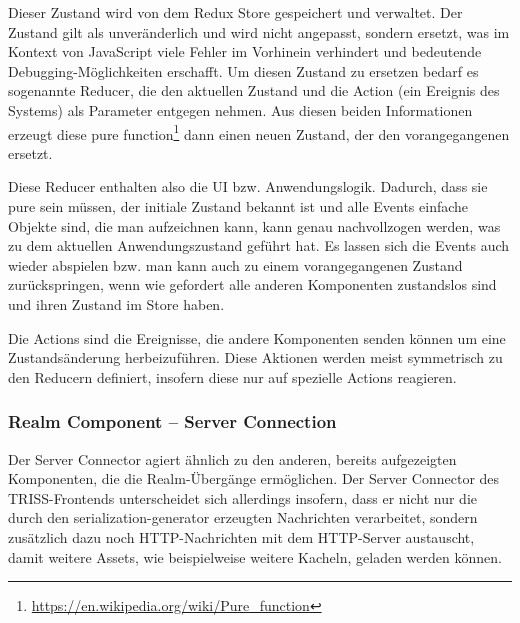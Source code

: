 Dieser Zustand wird von dem Redux Store gespeichert und verwaltet.
Der Zustand gilt als unveränderlich und wird nicht angepasst, sondern ersetzt, was im Kontext von JavaScript viele Fehler im Vorhinein verhindert und bedeutende Debugging-Möglichkeiten erschafft.
Um diesen Zustand zu ersetzen bedarf es sogenannte Reducer, die den aktuellen Zustand und die Action (ein Ereignis des Systems) als Parameter entgegen nehmen.
Aus diesen beiden Informationen erzeugt diese pure function\footnote{\url{https://en.wikipedia.org/wiki/Pure_function}} dann einen neuen Zustand, der den vorangegangenen ersetzt.

Diese Reducer enthalten also die UI bzw. Anwendungslogik.
Dadurch, dass sie pure sein müssen, der initiale Zustand bekannt ist und alle Events einfache Objekte sind, die man aufzeichnen kann, kann genau nachvollzogen werden, was zu dem aktuellen Anwendungszustand geführt hat.
Es lassen sich die Events auch wieder abspielen bzw. man kann auch zu einem vorangegangenen Zustand zurückspringen, wenn wie gefordert alle anderen Komponenten zustandslos sind und ihren Zustand im Store haben.

Die Actions sind die Ereignisse, die andere Komponenten senden können um eine Zustandsänderung herbeizuführen.
Diese Aktionen werden meist symmetrisch zu den Reducern definiert, insofern diese nur auf spezielle Actions reagieren.

\subsubsection{Realm Component – Server Connection}

Der Server Connector agiert ähnlich zu den anderen, bereits aufgezeigten Komponenten, die die Realm-Übergänge ermöglichen.
Der Server Connector des TRISS-Frontends unterscheidet sich allerdings insofern, dass er nicht nur die durch den serialization-generator erzeugten Nachrichten verarbeitet, sondern zusätzlich dazu noch HTTP-Nachrichten mit dem HTTP-Server austauscht, damit weitere Assets, wie beispielweise weitere Kacheln, geladen werden können.

